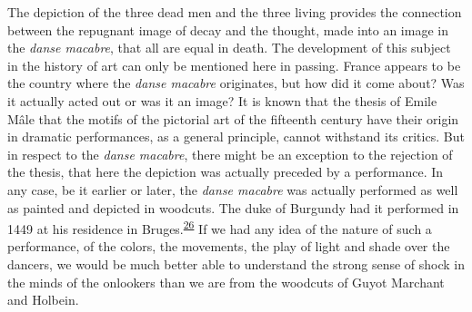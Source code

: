 The depiction of the three dead men and the three living provides the
connection between the repugnant image of decay and the thought, made
into an image in the \emph{danse macabre}, that all are equal in death.
The development of this subject in the history of art can only be
mentioned here in passing. France appears to be the country where the
\emph{danse macabre} originates, but how did it come about? Was it
actually acted out or was it an image? It is known that the thesis of
Emile Mâle that the motifs of the pictorial art of the fifteenth century
have their origin in dramatic performances, as a general principle,
cannot withstand its critics. But in respect to the \emph{danse
macabre}, there might be an exception to the rejection of the thesis,
that here the depiction was actually preceded by a performance. In any
case, be it earlier or later, the \emph{danse macabre} was actually
performed as well as painted and depicted in woodcuts. The duke of
Burgundy had it performed in 1449 at his residence in
Bruges.\textsuperscript{\protect\hypertarget{12_Chapter_Five__THE_VISION_OF_DEAT.xhtmlux5cux23id_1300}{\protect\hyperlink{23_NOTES.xhtmlux5cux23id_1301}{26}}}
If we had any idea of the nature of such a performance, of the colors,
the movements, the play of light and shade over the dancers, we would be
much better able to understand the strong sense of shock in the minds of
the onlookers than we are from the woodcuts of Guyot Marchant and
Holbein.


